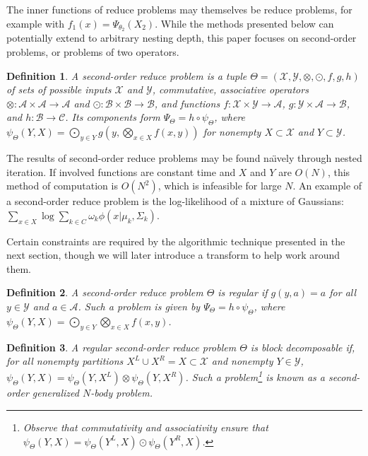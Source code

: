 \documentclass{article}
\newtheorem{definition} {Definition}
\newcommand{\comp}{\mathop{\circ}\nolimits}
\newcommand{\GNP}{\psi_{\Theta}}
\begin{document}
The inner functions of reduce problems may themselves be reduce
problems, for example with $f_1(x) = \Psi_{\theta_2}(X_2)$.  While the
methods presented below can potentially extend to arbitrary nesting
depth, this paper focuses on second-order problems, or problems of two
operators.
\begin{definition}
  A {\em second-order reduce problem} is a tuple $\Theta =
  (\mathcal{X},\mathcal{Y},\otimes,\odot,f,g,h)$ of sets of possible
  inputs $\mathcal{X}$ and $\mathcal{Y}$, commutative, associative
  operators $\otimes \colon \mathcal{A} \times \mathcal{A} \to
  \mathcal{A}$ and $\odot \colon \mathcal{B} \times \mathcal{B} \to
  \mathcal{B}$, and functions $f \colon \mathcal{X} \times \mathcal{Y}
  \to \mathcal{A}$, $g \colon \mathcal{Y} \times \mathcal{A} \to
  \mathcal{B}$, and $h \colon \mathcal{B} \to \mathcal{C}$.  Its
  components form $\Psi_{\Theta} = h \comp \psi_{\Theta}$, where
  $\psi_{\Theta}(Y,X) = \bigodot_{y \in Y} g \left( y,\bigotimes_{x
  \in X} f(x,y) \right)$ for nonempty $X \subset \mathcal{X}$ and $Y
  \subset \mathcal{Y}$.
\end{definition}
\noindent The results of second-order reduce problems may be found
na\"{\i}vely through nested iteration.  If involved functions are
constant time and $X$ and $Y$ are $O(N)$, this method of computation
is $O(N^2)$, which is infeasible for large $N$.  An example of a
second-order reduce problem is the log-likelihood of a mixture of
Gaussians: $\sum_{x \in X} \log \sum_{k \in C} \omega_k \phi(x |
\mu_k, \Sigma_k)$.

Certain constraints are required by the algorithmic technique
presented in the next section, though we will later introduce a
transform to help work around them.
\begin{definition}
  A second-order reduce problem $\Theta$ is {\em regular} if $g(y,a) =
  a$ for all $y \in \mathcal{Y}$ and $a \in \mathcal{A}$.  Such a
  problem is given by $\Psi_{\Theta} = h \comp \psi_{\Theta}$, where
  $\psi_{\Theta}(Y,X) = \bigodot_{y \in Y} \bigotimes_{x \in X}
  f(x,y)$.
\end{definition}
\begin{definition}
  A regular second-order reduce problem $\Theta$ is {\em block
  decomposable} if, for all nonempty partitions $X^L \cup X^R = X
  \subset \mathcal{X}$ and nonempty $Y \in \mathcal{Y}$, $\GNP(Y,X) =
  \GNP(Y,X^L) \otimes \GNP(Y,X^R)$.  Such a problem\footnote{Observe
  that commutativity and associativity ensure that $\GNP(Y,X) =
  \GNP(Y^L,X) \odot \GNP(Y^R,X)$.} is known as a {\em second-order
  generalized $N$-body problem}.
\end{definition}
\end{document}
